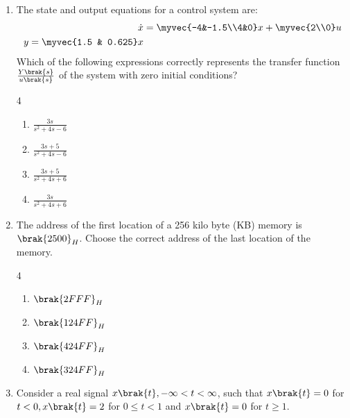 \begin{enumerate}[label=\thesubsection.\arabic*,ref=\thesubsection.\theenumi]
\item The state and output equations for a control system are:
	\begin{align*}
		\dot{x}&=\myvec{-4&-1.5\\4&0}x+\myvec{2\\0}u\\
		y=\myvec{1.5 & 0.625}x
	\end{align*}
Which of the following expressions correctly represents the transfer function$\frac{Y\brak{s}}{u\brak{s}}$
of the system with zero initial conditions?
\begin{multicols}{4}
	\begin{enumerate}
		\item $\frac{3s}{s^2+4s-6}$
		\item $\frac{3s+5}{s^2+4s-6}$
		\item $\frac{3s+5}{s^2+4s+6}$
		\item $\frac{3s}{s^2+4s+6}$
	\end{enumerate}
\end{multicols}
\item The address of the first location of a 256 kilo byte (KB) memory is $\brak{2500}_H$.
Choose the correct address of the last location of the memory.
\begin{multicols}{4}
	\begin{enumerate}
		\item $\brak{2FFF}_H$
		\item $\brak{124FF}_H$
		\item $\brak{424FF}_H$
		\item $\brak{324FF}_H$
	\end{enumerate}
\end{multicols}
\item Consider a real signal $x\brak{t}, -\infty < t < \infty$, such that
	$x\brak{t} = 0$ for$t <0, x\brak{t} = 2$ for $0 \leq t < 1$ and $x\brak{t} = 0$ for $t \geq 1$.


\end{enumerate}
